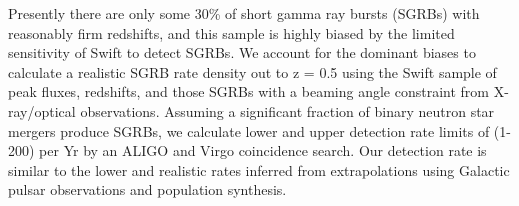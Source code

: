 


\bigskip



\bigskip

\noindent Presently there are only some 30\% of short gamma ray bursts (SGRBs) with reasonably firm redshifts, and this sample is highly biased by the limited sensitivity of Swift to detect SGRBs. We account for the dominant biases to calculate a realistic SGRB rate density out to z = 0.5 using the Swift sample of peak fluxes, redshifts, and those SGRBs with a beaming angle constraint from X-ray/optical observations. Assuming a significant fraction of binary neutron star mergers produce SGRBs, we calculate lower and upper detection rate limits of (1-200) per Yr by an ALIGO and Virgo coincidence search. Our detection rate is similar to the lower and realistic rates inferred from extrapolations using Galactic pulsar observations and population synthesis.

